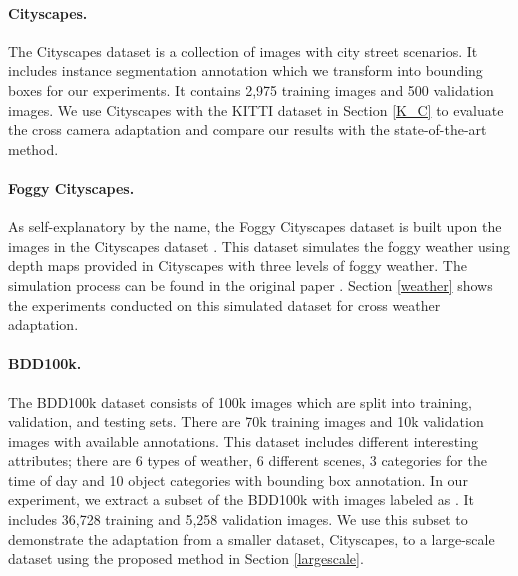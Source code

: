 \documentclass[10pt,twocolumn,letterpaper]{article}
\begin{document}
\vspace{-4mm}\paragraph{Cityscapes.} 
The Cityscapes dataset \cite{Cordts2016Cityscapes} is a collection of images with city street scenarios.
It includes instance segmentation annotation which we transform into bounding boxes for our experiments.
It contains 2,975 training images and 500 validation images.
We use Cityscapes with the KITTI dataset in Section \ref{K_C} to evaluate the cross camera adaptation and compare our results with the state-of-the-art method.

\vspace{-4mm}\paragraph{Foggy Cityscapes.} 
As self-explanatory by the name, the Foggy Cityscapes dataset \cite{SDV18} is built upon the images in the Cityscapes dataset \cite{Cordts2016Cityscapes}.
This dataset simulates the foggy weather using depth maps provided in Cityscapes with three levels of foggy weather.
The simulation process can be found in the original paper \cite{SDV18}.
Section \ref{weather} shows the experiments conducted on this simulated dataset for cross weather adaptation.

\vspace{-4mm}\paragraph{BDD100k.} 
The BDD100k dataset \cite{Yu2018BDD100KAD} consists of 100k images which are split into training, validation, and testing sets.
There are 70k training images and 10k validation images with available annotations.
This dataset includes different interesting attributes; there are 6 types of weather, 6 different scenes, 3 categories for the time of day and 10 object categories with bounding box annotation.
In our experiment, we extract a subset of the BDD100k with images labeled as .
It includes 36,728 training and 5,258 validation images.
We use this subset to demonstrate the adaptation from a smaller dataset, Cityscapes, to a large-scale dataset using the proposed method in Section \ref{largescale}.
\end{document}
